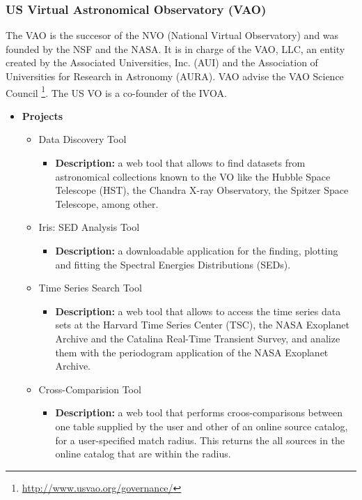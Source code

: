\subsubsection{US Virtual Astronomical Observatory (VAO)}
The VAO \cite{website:vao-home} \nocite{DeYoung2010} is the succesor of the NVO
(National Virtual Observatory) and was founded by the NSF and the NASA. It is in
charge of the VAO, LLC, an entity created by the Associated Universities, Inc.
(AUI) and the Association of Universities for Research in Astronomy (AURA). VAO
advise the VAO Science Council
\footnote{\url{http://www.usvao.org/governance/}}. The US VO is a co-founder of
the IVOA.

\begin{itemize}
\item \textbf{Projects}
\begin{itemize}
\item Data Discovery Tool
\begin{itemize}
\item \textbf{Description:} a web tool that allows to find datasets from
astronomical collections known to the VO like the Hubble Space Telescope (HST),
the Chandra X-ray Observatory, the Spitzer Space Telescope, among other.
\end{itemize}
\item Iris: SED Analysis Tool
\begin{itemize}
\item \textbf{Description:} a downloadable application for the finding, plotting
and fitting the Spectral Energies Distributions (SEDs). 
\end{itemize}
\item Time Series Search Tool
\begin{itemize}
\item \textbf{Description:} a web tool that allows to access the time series
data sets at the Harvard Time Series Center (TSC), the NASA Exoplanet Archive
and the Catalina Real-Time Transient Survey, and analize them with the
periodogram application of the NASA Exoplanet Archive.
\end{itemize}
\item Cross-Comparision Tool
\begin{itemize}
\item \textbf{Description:} a web tool that performs croos-comparisons between
one table supplied by the user and other of an online source catalog, for a
user-specified match radius. This returns the all sources in the online catalog
that are within the radius.
\end{itemize}
\end{itemize}
\end{itemize}


